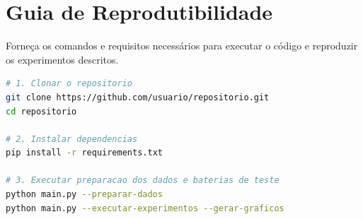 \documentclass[11pt,a4paper]{article}
\begin{document}
\appendix
\section{Guia de Reprodutibilidade}

\begin{instrucao}
Forneça os comandos e requisitos necessários para executar o código e reproduzir os experimentos descritos.
\end{instrucao}

\begin{lstlisting}[language=bash, caption={Instruções de Execução dos Experimentos}]
# 1. Clonar o repositorio
git clone https://github.com/usuario/repositorio.git
cd repositorio

# 2. Instalar dependencias
pip install -r requirements.txt

# 3. Executar preparacao dos dados e baterias de teste
python main.py --preparar-dados
python main.py --executar-experimentos --gerar-graficos
\end{lstlisting}
\end{document}
